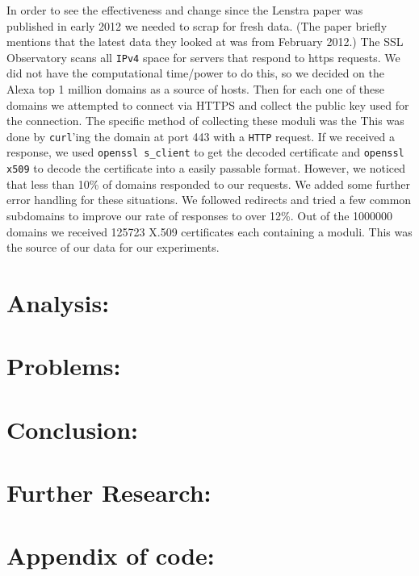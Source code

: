 \documentclass[12pt]{article}
\newcommand{\ty}[1]{\texttt{#1}}
\begin{document}
In order to see the effectiveness and change since the Lenstra paper was
published in early 2012 we needed to scrap for fresh data. (The paper briefly
mentions that the latest data they looked at was from February 2012.) The SSL
Observatory scans all \ty{IPv4} space for servers that respond to https requests. We
did not have the computational time/power to do this, so we decided on the Alexa
top 1 million domains as a source of hosts. Then for each one of these domains
we attempted to connect via HTTPS and collect the public key used for the
connection. The specific method of collecting these moduli was the  This was
done by \ty{curl}'ing the domain at port 443 with a \ty{HTTP} request. If we received a
response, we used \ty{openssl s\_client} to get the decoded certificate and
\ty{openssl x509} to decode the certificate into a easily passable format.
However, we noticed that less than 10\% of domains responded to our requests. We
added some further error handling for these situations. We followed redirects
and tried a few common subdomains to improve our rate of responses to over 12\%.
Out of the 1000000 domains we received 125723 X.509 certificates each containing
a moduli. This was the source of our data for our experiments.

\section{Analysis:}

\section{Problems:}

\section{Conclusion:}

\section{Further Research:}

\appendix
\section{Appendix of code:}




\end{document}
